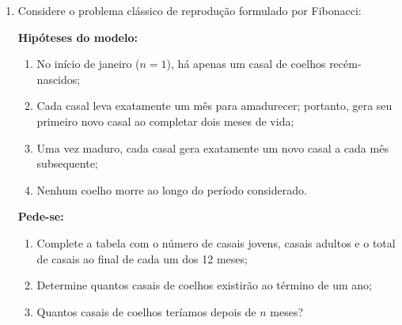 \documentclass[12pt,a4paper]{article}
\begin{document}
\begin{enumerate}
\begin{center}
\end{center}
\newpage
		\item Considere o problema clássico de reprodução formulado por Fibonacci:
		
		\textbf{Hipóteses do modelo:}
		\begin{enumerate}[label=\roman*.]
			\item No início de janeiro ($n = 1$), há apenas um casal de coelhos recém-nascidos;
			\item Cada casal leva exatamente um mês para amadurecer; portanto, gera seu primeiro novo casal ao completar dois meses de vida;
			\item Uma vez maduro, cada casal gera exatamente um novo casal a cada mês subsequente;
			\item Nenhum coelho morre ao longo do período considerado.
		\end{enumerate}
		
		\textbf{Pede-se:}
		\begin{enumerate}
			\item Complete a tabela com o número de casais jovens, casais adultos e o total de casais ao final de cada um dos 12 meses;
			\item Determine quantos casais de coelhos existirão ao término de um ano;
			\item Quantos casais de coelhos teríamos depois de $n$ meses?
		\end{enumerate}
		

\end{enumerate}
\end{document}
